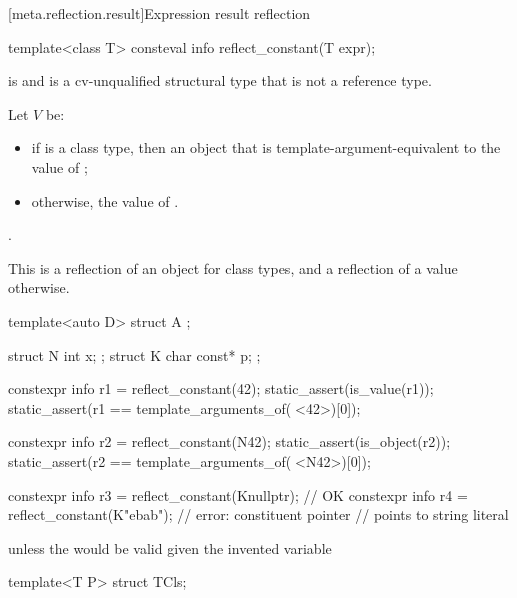 [meta.reflection.result]{Expression result reflection}

%
\begin{itemdecl}
template<class T>
  consteval info reflect_constant(T expr);
\end{itemdecl}

\begin{itemdescr}
\pnum
\mandates
{} is 
and  is a cv-unqualified structural type
that is not a reference type.

\pnum
Let $V$ be:
\begin{itemize}
\item
  if  is a class type,
  then an object that is template-argument-equivalent to the value of ;
\item
  otherwise, the value of .
\end{itemize}

\pnum
\returns
{}.
\begin{note}
This is a reflection of an object for class types,
and a reflection of a value otherwise.
\end{note}
\begin{example}
\begin{codeblock}
template<auto D>
  struct A { };

struct N { int x; };
struct K { char const* p; };

constexpr info r1 = reflect_constant(42);
static_assert(is_value(r1));
static_assert(r1 == template_arguments_of(^^A<42>)[0]);

constexpr info r2 = reflect_constant(N{42});
static_assert(is_object(r2));
static_assert(r2 == template_arguments_of(^^A<N{42}>)[0]);

constexpr info r3 = reflect_constant(K{nullptr});   // OK
constexpr info r4 = reflect_constant(K{"ebab"});    // error: constituent pointer
                                                    // points to string literal
\end{codeblock}
\end{example}

\pnum
\throws
{} unless
the   would be valid
given the invented variable
\begin{codeblock}
template<T P> struct TCls;
\end{codeblock}
\end{itemdescr}

